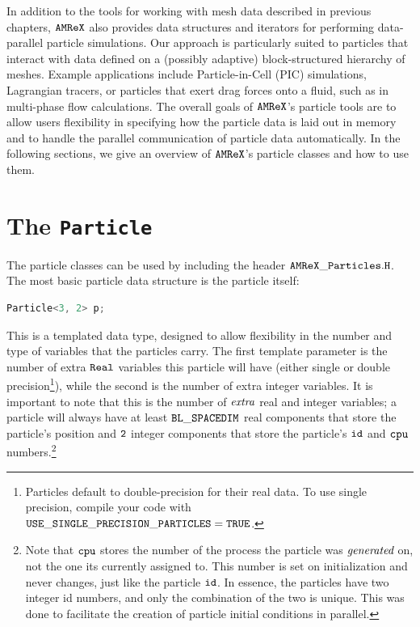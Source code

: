 In addition to the tools for working with mesh data described in previous chapters, $\tt{AMReX}$ also provides data structures and iterators for performing data-parallel particle simulations. Our approach is particularly suited to particles that interact with data defined on a (possibly adaptive) block-structured hierarchy of meshes. Example applications include Particle-in-Cell (PIC) simulations, Lagrangian tracers, or particles that exert drag forces onto a fluid, such as in multi-phase flow calculations. The overall goals of $\tt{AMReX}$'s particle tools are to allow users flexibility in specifying how the particle data is laid out in memory and to handle the parallel communication of particle data automatically. In the following sections, we give an overview of $\tt{AMReX}$'s particle classes and how to use them.

\section{The \tt{Particle}}
\label{sec:Particles:Particle}

The particle classes can be used by including the header $\tt{AMReX\_Particles.H}$. The most basic particle data structure is the particle itself: 

\begin{lstlisting}[language=cpp]
  Particle<3, 2> p;
\end{lstlisting}

This is a templated data type, designed to allow flexibility in the number and type of variables that the particles carry. The first template parameter is
the number of extra $\tt{Real}$ variables this particle will have (either single or double precision\footnote{Particles default to double-precision for their real data. To use single precision, compile your code with $\tt{USE\_SINGLE\_PRECISION\_PARTICLES=TRUE}$.}), while the second is the number of extra integer variables. 
It is important to note that this is the number of $\emph{extra}$ real and integer variables; a particle will always have at least $\tt{BL\_SPACEDIM}$ real components that store the particle's position and $\tt{2}$ integer components that store the particle's $\tt{id}$ and $\tt{cpu}$ numbers.\footnote{Note that $\tt{cpu}$ stores the number of the process the particle was $\emph{generated}$ on, not the one its currently assigned to. This number is set on initialization and never changes, just like the particle $\tt{id}$. In essence, the particles have two integer id numbers, and only the combination of the two is unique. This was done to facilitate the creation of particle initial conditions in parallel.}


